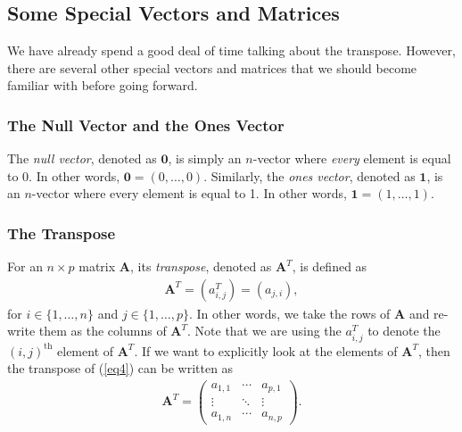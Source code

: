 \documentclass[10pt]{article}
\newcommand{\mydef}[1]{\textcolor{SteelBlue3}{\textit{#1}}} %
\begin{document}
\subsection{Some Special Vectors and Matrices}

We have already spend a good deal of time talking about the transpose. However, there are several other special vectors and matrices that we should become familiar with before going forward.

\subsubsection{The Null Vector and the Ones Vector}

The \mydef{null vector}, denoted as $\mathbf{0}$, is simply an $n$-vector where \textit{every} element is equal to 0. In other words, $\mathbf{0} = (0,\ldots,0)$. Similarly, the \mydef{ones vector}, denoted as $\mathbf{1}$, is an $n$-vector where every element is equal to 1. In other words, $\mathbf{1} = (1,\ldots,1)$.

\subsubsection{The Transpose}

For an $n \times p$ matrix $\mathbf{A}$, its \mydef{transpose}, denoted as $\mathbf{A}^T$, is defined as 
\begin{align}
    \label{transpose}
    \mathbf{A}^T = (a^T_{i,j}) = (a_{j,i}),
\end{align}
for $i \in \{ 1,\ldots,n \}$ and $j \in \{ 1,\ldots,p \}$. In other words, we take the rows of $\mathbf{A}$ and re-write them as the columns of $\mathbf{A}^T$. Note that we are using the $a^T_{i,j}$ to denote the $(i,j)^{\text{th}}$ element of $\mathbf{A}^T$. If we want to explicitly look at the elements of $\mathbf{A}^T$, then the transpose of (\ref{eq4}) can be written as
\begin{align}
    \label{transposefull}
    \mathbf{A}^T = \begin{pmatrix}
        a_{1,1} & \cdots & a_{p,1} \\
        \vdots & \ddots & \vdots \\
        a_{1,n} & \cdots & a_{n,p}
    \end{pmatrix}.
\end{align}

\end{document}
